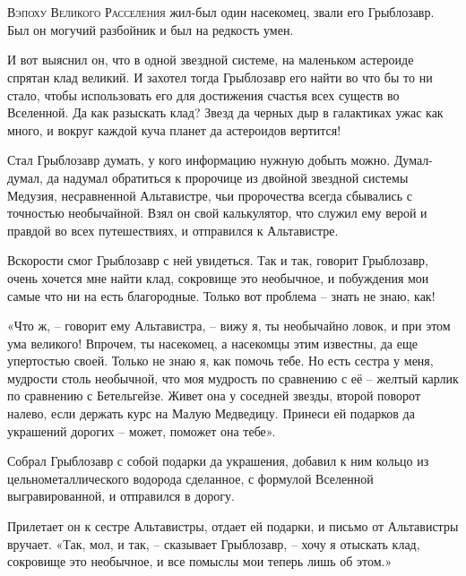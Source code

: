 \documentclass[ebook,oneside,final,openright]{memoir}
\begin{document}
\chapter{}
 \lettrine{В}{эпоху Великого Расселения} жил-был один насекомец, звали его Грыблозавр. Был он могучий разбойник и был на редкость умен.\par
\par
И вот выяснил он, что в одной звездной системе, на маленьком астероиде спрятан клад великий. И захотел тогда Грыблозавр его найти во что бы то ни стало, чтобы использовать его для достижения счастья всех существ во Вселенной. Да как разыскать клад? Звезд да черных дыр в галактиках ужас как много, и вокруг каждой куча планет да астероидов вертится!\par
\par
Стал Грыблозавр думать, у кого информацию нужную добыть можно. Думал-думал, да надумал обратиться к пророчице из двойной звездной системы Медузия, несравненной Альтавистре, чьи пророчества всегда сбывались с точностью необычайной. Взял он свой калькулятор, что служил ему верой и правдой во всех путешествиях, и отправился к Альтавистре.\par
\par
Вскорости смог Грыблозавр с ней увидеться. Так и так, говорит Грыблозавр, очень хочется мне найти клад, сокровище это необычное, и побуждения мои самые что ни на есть благородные. Только вот проблема – знать не знаю, как!\par
\par
«Что ж, – говорит ему Альтавистра, – вижу я, ты необычайно ловок, и при этом ума великого! Впрочем, ты насекомец, а насекомцы этим известны, да еще упертостью своей. Только не знаю я, как помочь тебе. Но есть сестра у меня, мудрости столь необычной, что моя мудрость по сравнению с её – желтый карлик по сравнению с Бетельгейзе. Живет она у соседней звезды, второй поворот налево, если держать курс на Малую Медведицу. Принеси ей подарков да украшений дорогих – может, поможет она тебе».\par
\par
Собрал Грыблозавр с собой подарки да украшения, добавил к ним кольцо из цельнометаллического водорода сделанное, с формулой Вселенной выгравированной, и отправился в дорогу.\par
\par
Прилетает он к сестре Альтавистры, отдает ей подарки, и письмо от Альтавистры вручает. «Так, мол, и так, – сказывает Грыблозавр, – хочу я отыскать клад, сокровище это необычное, и все помыслы мои теперь лишь об этом.»\par
\end{document}

